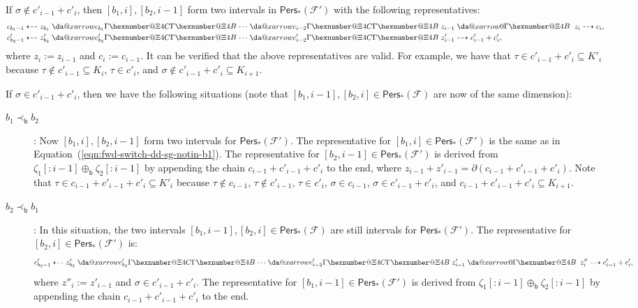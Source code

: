 \documentclass[letterpaper,11pt]{article}
\makeatletter
\theoremstyle{mythmstyle}
\theoremstyle{mydefstyle}
\theoremstyle{plain}
\theoremstyle{definition}
\newcommand{\Pers}{\mathsf{Pers}}
\newcommand{\<}[1]{\langle #1\rangle}
\newcommand{\Fcal}{\mathcal{F}}
\newcommand{\sG}{\sigma}
\newcommand{\tG}{\tau}
\newcommand{\bles}{\prec_{\mathsf{b}}}
\newcommand{\brepsum}{\oplus_{\mathsf{b}}}
\newcommand{\cyc}{z}
\newcommand{\chn}{c}
\newcommand{\rseq}{\zeta}
\newcommand{\rsprefix}[1]{{[:\!#1]}}
\newcommand*{\da@rightarrow}{\mathchar"0\hexnumber@\symAMSa 4B }
\newcommand*{\da@leftarrow}{\mathchar"0\hexnumber@\symAMSa 4C }
\newcommand*{\xdashrightarrow}[2][]{%
  \mathrel{%
    \mathpalette{\da@xarrow{#1}{#2}{}\da@rightarrow{\;}{}}{}%
  }%
}
\newcommand{\xdashleftrightarrow}[2][]{%
  \mathrel{%
    \mathpalette{\da@xarrow{#1}{#2}\da@leftarrow\da@rightarrow{}{}}{}%
  }%
}
\newcommand*{\da@xarrow}[7]{%
  \sbox0{$\ifx#7\scriptstyle\scriptscriptstyle\else\scriptstyle\fi#5#1#6\m@th$}%
  \sbox2{$\ifx#7\scriptstyle\scriptscriptstyle\else\scriptstyle\fi#5#2#6\m@th$}%
  \sbox4{$#7\dabar@\m@th$}%
  \dimen@=\wd0 %
  \ifdim\wd2 >\dimen@
    \dimen@=\wd2 %
  \fi
  \count@=2 %
  \def\da@bars{\dabar@\dabar@}%
  \@whiledim\count@\wd4<\dimen@\do{%
    \advance\count@\@ne
    \expandafter\def\expandafter\da@bars\expandafter{%
      \da@bars
      \dabar@ 
    }%
  }%
  \mathrel{#3}%
  \mathrel{%
    \mathop{\da@bars}\limits
    \ifx\\#1\\%
    \else
      _{\copy0}%
    \fi
    \ifx\\#2\\%
    \else
      ^{\copy2}%
    \fi
  }%
  \mathrel{#4}%
  \!\!
}
\let\rseqlrarr\xdashleftrightarrow
\let\rseqrarr\xdashrightarrow
\makeatother
\begin{document}
If $\sG\not\in\chn'_{i-1}+\chn'_{i}$,
then $[b_1,i],[b_2,i-1]$ form two intervals in $\Pers_*(\Fcal')$
with the following representatives:
\begin{alignat}{1}
&\chn_{b_1-1}\dashleftarrow\cyc_{b_1}\rseqlrarr{\chn_{b_1}}\cdots
\rseqlrarr{\chn_{i-2}}\cyc_{i-1}
\rseqrarr{0}\cyc_{i}\dashrightarrow\chn_{i},
\label{eqn:fwd-switch-dd-sg-notin-b1}\\
&\chn'_{b_2-1}\dashleftarrow\cyc'_{b_2}\rseqlrarr{\chn'_{b_2}}\cdots
\rseqlrarr{\chn'_{i-2}}\cyc'_{i-1}
\dashrightarrow\chn'_{i-1}+\chn'_{i},
\end{alignat}
where $\cyc_{i}:=\cyc_{i-1}$ and $\chn_{i}:=\chn_{i-1}$. 
It can be verified that the above representatives are valid. For example, 
we have that $\tG\in\chn'_{i-1}+\chn'_{i}\subseteq K'_i$ because 
$\tG\not\in\chn'_{i-1}\subseteq K_{i}$,
$\tG\in\chn'_{i}$,
and $\sG\not\in\chn'_{i-1}+\chn'_{i}\subseteq K_{i+1}$.

If $\sG\in\chn'_{i-1}+\chn'_{i}$,
then we have the following situations
(note that $[b_1,i-1],[b_2,i]\in\Pers_*(\Fcal)$
are now of the same dimension):
\begin{description}
    \item[$b_1\bles b_2$]:
    Now $[b_1,i],[b_2,i-1]$
    form two intervals for $\Pers_*(\Fcal')$.
    The representative for $[b_1,i]\in\Pers_*(\Fcal')$
    is the same as in
    Equation~(\ref{eqn:fwd-switch-dd-sg-notin-b1}).
    The representative for $[b_2,i-1]\in\Pers_*(\Fcal')$
    is derived from $\rseq_1\rsprefix{i-1}\brepsum\rseq_2\rsprefix{i-1}$
    by appending the chain $\chn_{i-1}+\chn'_{i-1}+\chn'_{i}$ to the end,
    where $\cyc_{i-1}+\cyc'_{i-1}=\partial(\chn_{i-1}+\chn'_{i-1}+\chn'_{i})$.
    Note that $\tG\in\chn_{i-1}+\chn'_{i-1}+\chn'_{i}\subseteq K'_{i}$ 
    because 
    $\tG\not\in\chn_{i-1}$,
    $\tG\not\in\chn'_{i-1}$,
    $\tG\in\chn'_{i}$,
    $\sG\in\chn_{i-1}$,
    $\sG\in\chn'_{i-1}+\chn'_{i}$,
    and $\chn_{i-1}+\chn'_{i-1}+\chn'_{i}\subseteq K_{i+1}$.
    
    \item[$b_2\bles b_1$]:
    In this situation, the two intervals
    $[b_1,i-1],[b_2,i]\in\Pers_*(\Fcal)$
    are still intervals for $\Pers_*(\Fcal')$.
    The representative for $[b_2,i]\in\Pers_*(\Fcal')$
    is:
    \[\chn'_{b_2-1}\dashleftarrow\cyc'_{b_2}\rseqlrarr{\chn'_{b_2}}\cdots
    \rseqlrarr{\chn'_{i-2}}\cyc'_{i-1}
    \rseqrarr{0}\cyc''_{i}
    \dashrightarrow\chn'_{i-1}+\chn'_{i},\]
    where $\cyc''_{i}:=\cyc'_{i-1}$ 
    and $\sG\in\chn'_{i-1}+\chn'_{i}$.
    The representative for $[b_1,i-1]\in\Pers_*(\Fcal')$
    is derived from $\rseq_1\rsprefix{i-1}\brepsum\rseq_2\rsprefix{i-1}$
    by appending the chain $\chn_{i-1}+\chn'_{i-1}+\chn'_{i}$ to the end.
\end{description}
\end{document}
